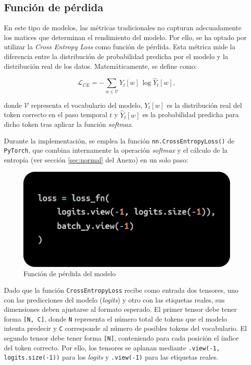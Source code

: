 \documentclass[11pt]{book}
\begin{document}
\subsection{Función de pérdida}

En este tipo de modelos, las métricas tradicionales no capturan adecuadamente los matices que determinan el rendimiento del modelo. Por ello, se ha optado por utilizar la \textit{Cross Entropy Loss} como función de pérdida. Esta métrica mide la diferencia entre la distribución de probabilidad predicha por el modelo y la distribución real de los datos. 
Matemáticamente, se define como:

\[
\mathcal{L}_{CE} = - \sum_{w \in \mathcal{V}} Y_t[w] \, \log \hat{Y}_t[w],
\]

donde $\mathcal{V}$ representa el vocabulario del modelo, $Y_t[w]$ es la distribución real del token correcto en el paso temporal $t$ y $\hat{Y}_t[w]$ es la probabilidad predicha para dicho token tras aplicar la función \textit{softmax}.

Durante la implementación, se emplea la función \texttt{nn.CrossEntropyLoss()} de \texttt{PyTorch}, que combina internamente la operación \textit{softmax} y el cálculo de la entropía (ver sección \ref{sec:normal} del Anexo) en un solo paso:

\begin{figure}[h]
    \centering
    \includegraphics[width=0.5\linewidth]{img/cross_entropy.png}
    \caption{Función de pérdida del modelo \parencite{geeksforgeeks_crossentropy}}
    \label{fig:placeholder20}
\end{figure}

Dado que la función \texttt{CrossEntropyLoss} recibe como entrada dos tensores, uno con las predicciones del modelo (\textit{logits}) y otro con las etiquetas reales, sus dimensiones deben ajustarse al formato esperado. El primer tensor debe tener forma \texttt{[N, C]}, donde \texttt{N} representa el número total de tokens que el modelo intenta predecir y \texttt{C} corresponde al número de posibles tokens del vocabulario. El segundo tensor debe tener forma \texttt{[N]}, conteniendo para cada posición el índice del token correcto. Por ello, los tensores se aplanan mediante \texttt{.view(-1, logits.size(-1))} para los \textit{logits} y \texttt{.view(-1)} para las etiquetas reales.
\end{document}
